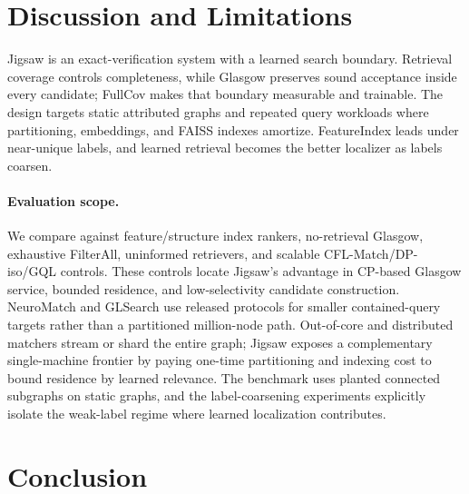 \documentclass[runningheads]{llncs}
\begin{document}
\section{Discussion and Limitations}
\label{sec:limits}

Jigsaw is an exact-verification system with a learned search boundary. Retrieval coverage controls completeness, while Glasgow preserves sound acceptance inside every candidate; FullCov makes that boundary measurable and trainable. The design targets static attributed graphs and repeated query workloads where partitioning, embeddings, and FAISS indexes amortize. FeatureIndex leads under near-unique labels, and learned retrieval becomes the better localizer as labels coarsen.

\paragraph{Evaluation scope.} We compare against feature/structure index rankers, no-retrieval Glasgow, exhaustive FilterAll, uninformed retrievers, and scalable CFL-Match/DP-iso/GQL controls. These controls locate Jigsaw's advantage in CP-based Glasgow service, bounded residence, and low-selectivity candidate construction. NeuroMatch and GLSearch use released protocols for smaller contained-query targets rather than a partitioned million-node path. Out-of-core and distributed matchers stream or shard the entire graph; Jigsaw exposes a complementary single-machine frontier by paying one-time partitioning and indexing cost to bound residence by learned relevance. The benchmark uses planted connected subgraphs on static graphs, and the label-coarsening experiments explicitly isolate the weak-label regime where learned localization contributes.

\section{Conclusion}
\end{document}

